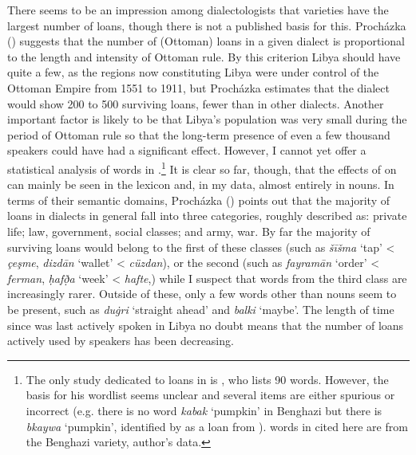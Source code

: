\documentclass[output=paper]{langsci/langscibook}
\begin{document}
  There seems to be an impression among dialectologists that  varieties have the largest number of  loans, though there is not a published basis for this. Procházka (\citeyear[191]{Procházka2005}) suggests that the number of (Ottoman)  loans in a given  dialect is proportional to the length and intensity of Ottoman rule. By this criterion Libya should have quite a few, as the regions now constituting Libya were under control of the Ottoman Empire from 1551 to 1911, but Procházka estimates that the dialect would show 200 to 500 surviving loans, fewer than in other dialects. Another important factor is likely to be that Libya’s population was very small during the period of Ottoman rule so that the long-term presence of even a few thousand  speakers could have had a significant effect. However, I cannot yet offer a statistical analysis of  words in .\footnote{The only study dedicated to  loans in  is \citet{Türkmen1988}, who lists 90 words. However, the basis for his wordlist seems unclear and  several items are either spurious or incorrect (e.g. there is no word \textit{kabak} ‘pumpkin’ in Benghazi  but there is \textit{bkaywa} ‘pumpkin’, identified by \citet{Souag2013lexical} as a loan from ).  words in  cited here are from the Benghazi variety, author’s data.} It is clear so far, though, that the effects of  on  can mainly be seen in the lexicon and, in my data, almost entirely in nouns. In terms of their semantic domains, Procházka (\citeyear[192]{Procházka2005}) points out that the majority of  loans in  dialects in general fall into three categories, roughly described as: private life; law, government, social classes; and army, war. By far the majority of surviving loans would belong to the first of these classes (such as \textit{šīšma} ‘tap’ < \textit{çeşme}, \textit{dizdān} ‘wallet’ < \textit{cüzdan}), or the second (such as \textit{fayramān} ‘order’ < \textit{ferman}, \textit{ḥafð̣a} ‘week’ < \textit{hafte},) while I suspect that words from the third class are increasingly rarer. Outside of these, only a few words other than nouns seem to be present, such as \textit{du\.gri} ‘straight ahead’ and \textit{balki} ‘maybe’. The length of time since  was last actively spoken in Libya no doubt means that the number of  loans actively used by speakers has been decreasing.
\end{document}
